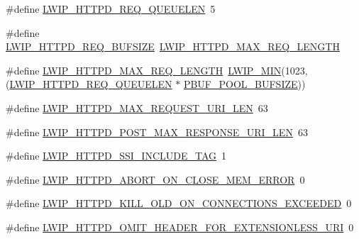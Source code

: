 \begin{DoxyCompactItemize}
\item 
\#define \hyperlink{group__httpd__opts_gaef23f4e3525aa5dd0ecbce9b5e16d4e0}{L\+W\+I\+P\+\_\+\+H\+T\+T\+P\+D\+\_\+\+R\+E\+Q\+\_\+\+Q\+U\+E\+U\+E\+L\+EN}~5
\item 
\#define \hyperlink{group__httpd__opts_ga8dbe61a35228da0e7365a088197191b8}{L\+W\+I\+P\+\_\+\+H\+T\+T\+P\+D\+\_\+\+R\+E\+Q\+\_\+\+B\+U\+F\+S\+I\+ZE}~\hyperlink{group__httpd__opts_ga30dc71c59f3904df7daaf293f74f91f8}{L\+W\+I\+P\+\_\+\+H\+T\+T\+P\+D\+\_\+\+M\+A\+X\+\_\+\+R\+E\+Q\+\_\+\+L\+E\+N\+G\+TH}
\item 
\#define \hyperlink{group__httpd__opts_ga30dc71c59f3904df7daaf293f74f91f8}{L\+W\+I\+P\+\_\+\+H\+T\+T\+P\+D\+\_\+\+M\+A\+X\+\_\+\+R\+E\+Q\+\_\+\+L\+E\+N\+G\+TH}~\hyperlink{openmote-cc2538_2lwip_2src_2include_2lwip_2def_8h_a748f5df614a3fc989e8900fd229d6e4e}{L\+W\+I\+P\+\_\+\+M\+IN}(1023, (\hyperlink{group__httpd__opts_gaef23f4e3525aa5dd0ecbce9b5e16d4e0}{L\+W\+I\+P\+\_\+\+H\+T\+T\+P\+D\+\_\+\+R\+E\+Q\+\_\+\+Q\+U\+E\+U\+E\+L\+EN} $\ast$ \hyperlink{group__lwip__opts__pbuf_gae61f4491d56e805e79b79eb5d35a00e5}{P\+B\+U\+F\+\_\+\+P\+O\+O\+L\+\_\+\+B\+U\+F\+S\+I\+ZE}))
\item 
\#define \hyperlink{group__httpd__opts_gaca4ef53e7a9abbd8d4bd8bc1ba7b486a}{L\+W\+I\+P\+\_\+\+H\+T\+T\+P\+D\+\_\+\+M\+A\+X\+\_\+\+R\+E\+Q\+U\+E\+S\+T\+\_\+\+U\+R\+I\+\_\+\+L\+EN}~63
\item 
\#define \hyperlink{group__httpd__opts_gaa27f7c5450392d10aeed033ca878cce3}{L\+W\+I\+P\+\_\+\+H\+T\+T\+P\+D\+\_\+\+P\+O\+S\+T\+\_\+\+M\+A\+X\+\_\+\+R\+E\+S\+P\+O\+N\+S\+E\+\_\+\+U\+R\+I\+\_\+\+L\+EN}~63
\item 
\#define \hyperlink{group__httpd__opts_ga975961a6d22d1a077118fb85dfec809a}{L\+W\+I\+P\+\_\+\+H\+T\+T\+P\+D\+\_\+\+S\+S\+I\+\_\+\+I\+N\+C\+L\+U\+D\+E\+\_\+\+T\+AG}~1
\item 
\#define \hyperlink{group__httpd__opts_ga0ff20ebc4ab50d4aa6151c3241dacb3a}{L\+W\+I\+P\+\_\+\+H\+T\+T\+P\+D\+\_\+\+A\+B\+O\+R\+T\+\_\+\+O\+N\+\_\+\+C\+L\+O\+S\+E\+\_\+\+M\+E\+M\+\_\+\+E\+R\+R\+OR}~0
\item 
\#define \hyperlink{group__httpd__opts_ga0d5074965efd40786182287895feb691}{L\+W\+I\+P\+\_\+\+H\+T\+T\+P\+D\+\_\+\+K\+I\+L\+L\+\_\+\+O\+L\+D\+\_\+\+O\+N\+\_\+\+C\+O\+N\+N\+E\+C\+T\+I\+O\+N\+S\+\_\+\+E\+X\+C\+E\+E\+D\+ED}~0
\item 
\#define \hyperlink{group__httpd__opts_ga82a030ce2ecdcf741b02b7be41c012b3}{L\+W\+I\+P\+\_\+\+H\+T\+T\+P\+D\+\_\+\+O\+M\+I\+T\+\_\+\+H\+E\+A\+D\+E\+R\+\_\+\+F\+O\+R\+\_\+\+E\+X\+T\+E\+N\+S\+I\+O\+N\+L\+E\+S\+S\+\_\+\+U\+RI}~0

\end{DoxyCompactItemize}
